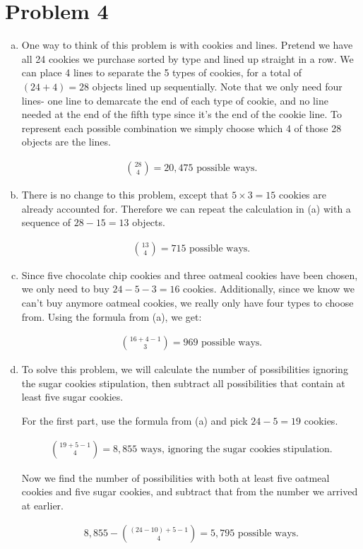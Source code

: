 \documentclass[11pt]{article}
\begin{document}
\section*{Problem 4}
	\begin{enumerate}[(a)]
	\item
		One way to think of this problem is with cookies and lines. Pretend we have all 24 cookies we purchase sorted by type and lined up straight 
		in a row. We can place 4 lines to separate the 5 types of cookies, for a total of $(24+4) = 28$ objects lined up sequentially. Note that we 
		only need four lines- one line to demarcate the end of each type of cookie, and no line needed at the end of the fifth type since it's the 
		end of the cookie line. To represent each possible combination we simply choose which 4 of those 28 objects are the lines.
		
		\begin{align*}
		\binom{28}{4} = 20,475 \text{ possible ways.}
		\end{align*}
	
	\item
		There is no change to this problem, except that $5 \times 3 = 15$ cookies are already accounted for. Therefore we can repeat the 
		calculation in (a) with a sequence of $28-15 =13$ objects.
		
		\begin{align*}
		\binom{13}{4} = 715 \text{ possible ways.}
		\end{align*}
		
	\item
		Since five chocolate chip cookies and three oatmeal cookies have been chosen, we only need to buy $24-5-3= 16$ cookies. Additionally, since 
		we know we can't buy anymore oatmeal cookies, we really only have four types to choose from. Using the formula from (a), we get:
		
		\begin{align*}
		\binom{16+4-1}{3} = 969 \text{ possible ways.}
		\end{align*}
		
	\item
		To solve this problem, we will calculate the number of possibilities ignoring the sugar cookies stipulation, then subtract all 
		possibilities that contain at least five sugar cookies.
		
		For the first part, use the formula from (a) and pick $24-5 = 19$ cookies.
		
		\begin{align*}
		\binom{19+5-1}{4} = 8,855 \text{ ways, ignoring the sugar cookies stipulation.}
		\end{align*}
		
		Now we find the number of possibilities with both at least five oatmeal cookies and five sugar cookies, and subtract that from the number 
		we arrived at earlier.
		
		\begin{align*}
		8,855 - \binom{(24-10)+5-1}{4} = 5,795 \text{ possible ways.}
		\end{align*}
	\end{enumerate}
	
\end{document}
